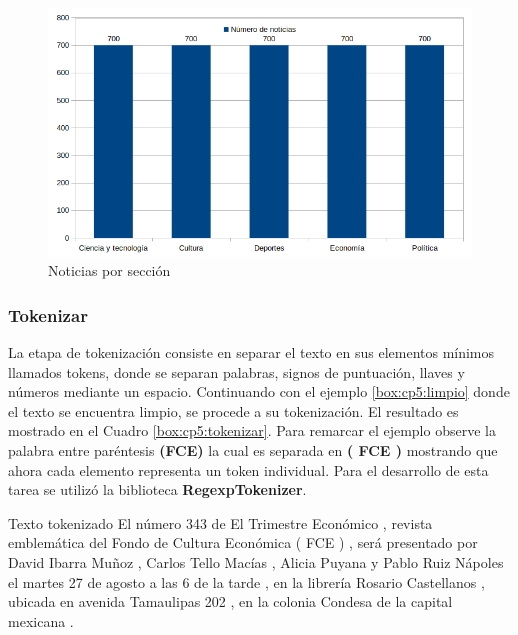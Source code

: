 \begin{figure}[H]
	\centering
	\includegraphics[scale=.5]{imagenes/Capitulo5/noticiasBalanceadas.png}
	\caption{Noticias por sección}
	\label{fig:notBalanceadas}
\end{figure}

\subsubsection{Tokenizar}
La etapa de tokenización consiste en separar el texto en sus elementos mínimos llamados tokens, donde se separan palabras, signos de puntuación, llaves y números mediante un espacio. Continuando con el ejemplo \ref{box:cp5:limpio} donde el texto se encuentra limpio, se procede a su tokenización. El resultado es mostrado en el Cuadro \ref{box:cp5:tokenizar}. Para remarcar el ejemplo observe la palabra entre paréntesis \textbf{(FCE)} la cual es separada en \textbf{( FCE )} mostrando que ahora cada elemento representa un token individual. Para el desarrollo de esta tarea se utilizó la biblioteca \textbf{RegexpTokenizer}.\\

\begin{mygraybox}[label={box:cp5:tokenizar}]{Texto tokenizado} 
El número 343 de El Trimestre Económico , revista emblemática del Fondo de Cultura 
Económica ( FCE ) , será presentado por David Ibarra Muñoz , Carlos Tello Macías , Alicia Puyana y Pablo Ruiz Nápoles el martes 27 de agosto a las 6 de la tarde , en la librería Rosario Castellanos , ubicada en avenida Tamaulipas 202 , en la colonia Condesa de la capital mexicana .
\end{mygraybox}

